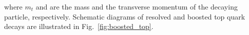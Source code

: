 where $m_t$ and \pt are the mass and the transverse momentum of the decaying particle, respectively. Schematic diagrams of resolved and boosted top quark decays are illustrated in Fig.~\ref{fig:boosted_top}. \\

